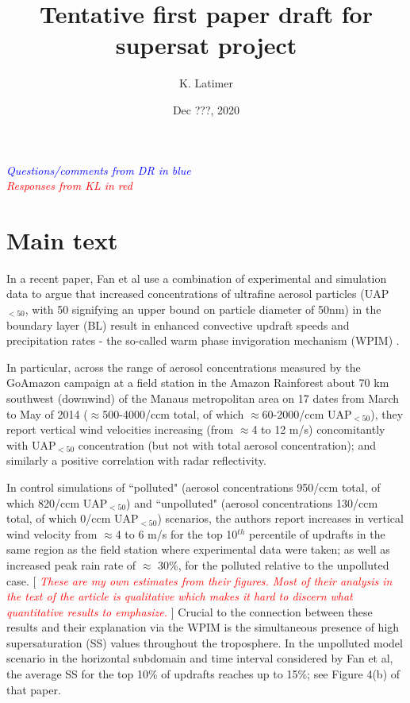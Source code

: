 \documentclass{article}
\title{Tentative first paper draft for supersat project}
\author{K. Latimer}
\date{Dec ???, 2020}
\newcommand{\drcomm}[1]{\textcolor{blue}{\textit{#1}}}
\newcommand{\klcomm}[1]{\textcolor{red}{\textit{#1}}}
\begin{document}
\maketitle

\noindent\drcomm{Questions/comments from DR in blue} \\
\noindent\klcomm{Responses from KL in red}\\

\section{Main text}

In a recent paper, Fan et al use a combination of experimental and simulation data to argue that increased concentrations of ultrafine aerosol particles (UAP$_{<50}$, with 50 signifying an upper bound on particle diameter of 50nm) in the boundary layer (BL) result in enhanced convective updraft speeds and precipitation rates - the so-called warm phase invigoration mechanism (WPIM) \cite{Fan2018}. 

In particular, across the range of aerosol concentrations measured by the GoAmazon campaign at a field station in the Amazon Rainforest about 70 km southwest (downwind) of the Manaus metropolitan area on 17 dates from March to May of 2014 ($\approx$500-4000/ccm total, of which $\approx$60-2000/ccm UAP$_{<50}$), they report vertical wind velocities increasing (from $\approx$4 to 12 m/s) concomitantly with UAP$_{<50}$ concentration (but not with total aerosol concentration); and similarly a positive correlation with radar reflectivity. 

In control simulations of ``polluted" (aerosol concentrations 950/ccm total, of which 820/ccm UAP$_{<50}$) and ``unpolluted" (aerosol concentrations 130/ccm total, of which 0/ccm UAP$_{<50}$) scenarios, the authors report increases in vertical wind velocity from $\approx$4 to 6 m/s for the top 10$^{th}$ percentile of updrafts in the same region as the field station where experimental data were taken; as well as increased peak rain rate of $\approx$ 30\%, for the polluted relative to the unpolluted case. [ \klcomm{These are my own estimates from their figures. Most of their analysis in the text of the article is qualitative which makes it hard to discern what quantitative results to emphasize.} ] Crucial to the connection between these results and their explanation via the WPIM is the simultaneous presence of high supersaturation (SS) values throughout the troposphere. In the unpolluted model scenario in the horizontal subdomain and time interval considered by Fan et al, the average SS for the top 10\% of updrafts reaches up to 15\%; see Figure 4(b) of that paper.
\end{document}
